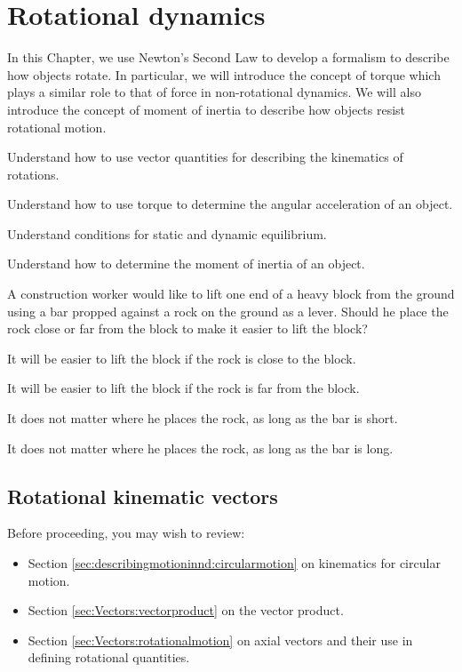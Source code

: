 
\chapter{Rotational dynamics}
\label{chapter:rotationaldynamics}
In this Chapter, we use Newton's Second Law to develop a formalism to describe how objects rotate. In particular, we will introduce the concept of torque which plays a similar role to that of force in non-rotational dynamics. We will also introduce the concept of moment of inertia to describe how objects resist rotational motion. 

\begin{learningObjectives}
{
 \item Understand how to use vector quantities for describing the kinematics of rotations.
 \item Understand how to use torque to determine the angular acceleration of an object.
 \item Understand conditions for static and dynamic equilibrium. 
 \item Understand how to determine the moment of inertia of an object.
 }
\end{learningObjectives}

\begin{opening}
\begin{MCquestion}{A construction worker would like to lift one end of a heavy block from the ground using a bar propped against a rock on the ground as a lever. Should he place the rock close or far from the block to make it easier to lift the block?}
\item It will be easier to lift the block if the rock is close to the block. \correct
\item It will be easier to lift the block if the rock is far from the block.
\item It does not matter where he places the rock, as long as the bar is short.
\item It does not matter where he places the rock, as long as the bar is long.
\end{MCquestion}
\end{opening}

\section{Rotational kinematic vectors}

\begin{review}
Before proceeding, you may wish to review:
\begin{itemize}[topsep=-10pt]
\item Section \ref{sec:describingmotioninnd:circularmotion} on kinematics for circular motion.
\item Section \ref{sec:Vectors:vectorproduct} on the vector product.
\item Section \ref{sec:Vectors:rotationalmotion} on axial vectors and their use in defining rotational quantities.
\end{itemize}
\end{review}

